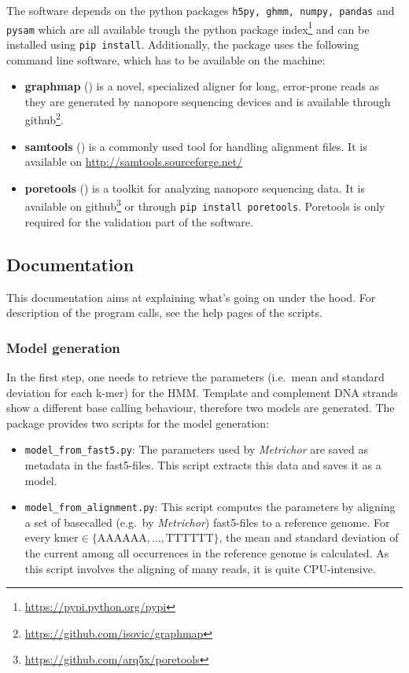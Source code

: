 \documentclass[]{scrartcl}
\begin{document}
The software depends on the python packages \texttt{h5py, ghmm, numpy, pandas} and \texttt{pysam} which are all available trough the python package index\footnote{\url{https://pypi.python.org/pypi}} and can be installed using \texttt{pip install}. Additionally, the package uses the following command line software, which has to be available on the machine: 
\begin{itemize}
\item \textbf{graphmap} (\cite{Sovic2015GRAPHMAP}) is a novel, specialized aligner for long, error-prone reads as they are generated by nanopore sequencing devices and is available through github\footnote{\url{https://github.com/isovic/graphmap}}.
\item \textbf{samtools} (\cite{Li2009SAMTOOLS}) is a commonly used tool for handling alignment files. It is available on \url{http://samtools.sourceforge.net/}
\item \textbf{poretools} (\cite{Loman2014PORETOOLS})  is a toolkit for analyzing nanopore sequencing data. It is available on github\footnote{\url{https://github.com/arq5x/poretools}} or through \texttt{pip install poretools}. Poretools is only required for the validation part of the software. 
\end{itemize}

\subsection{Documentation}
This documentation aims at explaining what's going on under the hood. For description of the program calls, see the help pages of the scripts. 
 
\subsubsection{Model generation}
In the first step, one needs to retrieve the parameters (i.e.\ mean and standard deviation for each k-mer) for the HMM. Template and complement DNA strands show a different base calling behaviour, therefore two models are generated. The package provides two scripts for the model generation: 

\begin{itemize}
\item \texttt{model\_from\_fast5.py}: The parameters used by \textit{Metrichor} are saved as metadata in the fast5-files. This script extracts this data and saves it as a model. 
\item \texttt{model\_from\_alignment.py}: This script computes the parameters by aligning a set of basecalled (e.g.\ by \textit{Metrichor}) fast5-files to a reference genome. For every $\mathrm{kmer} \in \{\mathrm{AAAAAA}, \dots, \mathrm{TTTTTT}\}$, the mean and standard deviation of the current among all occurrences in the reference genome is calculated. As this script involves the aligning of many reads, it is quite CPU-intensive.
\end{itemize}
\end{document}
